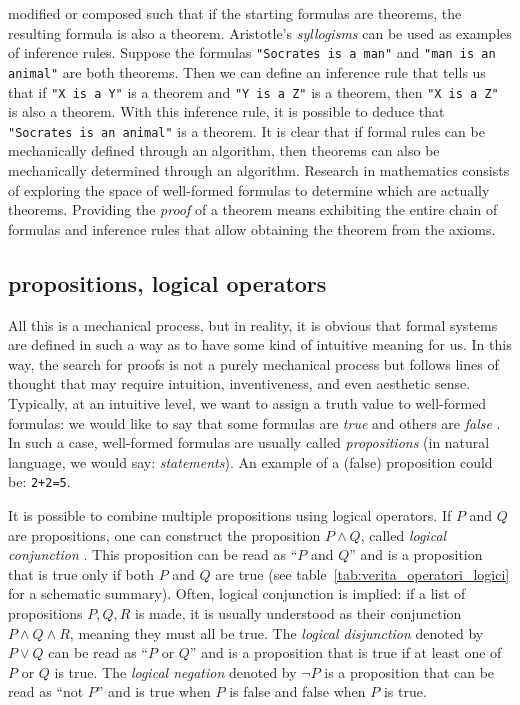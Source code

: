 modified or composed such that if the starting formulas are theorems, the
resulting formula is also a theorem. Aristotle's \emph{syllogisms} can be used
as examples of inference rules. Suppose the formulas \texttt{"Socrates is a
man"} and \texttt{"man is an animal"} are both theorems. Then we can define an
inference rule that tells us that if \texttt{"X is a Y"} is a theorem and
\texttt{"Y is a Z"} is a theorem, then \texttt{"X is a Z"} is also a theorem.
With this inference rule, it is possible to deduce that \texttt{"Socrates is an
animal"} is a theorem. It is clear that if formal rules can be mechanically
defined through an algorithm, then theorems can also be mechanically determined
through an algorithm. Research in mathematics consists of exploring the space of
well-formed formulas to determine which are actually theorems. Providing the
\emph{proof}%
%
 of a theorem means exhibiting the entire chain of formulas and inference rules that allow obtaining the theorem from the axioms.

\subsection{propositions, logical operators}

All this is a mechanical process, but in reality, it is obvious that formal
systems are defined in such a way as to have some kind of intuitive meaning for
us. In this way, the search for proofs is not a purely mechanical process but
follows lines of thought that may require intuition, inventiveness, and even
aesthetic sense. Typically, at an intuitive level, we want to assign a truth
value to well-formed formulas: we would like to say that some formulas are
\emph{true}%
%
 and others are \emph{false}%
%
. In such a case, well-formed formulas are usually called \emph{propositions}%
%
 (in natural language, we would say: \emph{statements}). An example of a (false) proposition could be: \texttt{2+2=5}.

It is possible to combine multiple propositions using logical operators. If $P$
and $Q$ are propositions, one can construct the proposition $P \land Q$, called
\emph{logical conjunction}%
%
. This proposition can be read as ``$P$ and $Q$'' and is a proposition that is true only if both $P$ and $Q$ are true (see table~\ref{tab:verita_operatori_logici} for a schematic summary). Often, logical conjunction is implied: if a list of propositions $P,Q,R$ is made, it is usually understood as their conjunction $P \land Q \land R$, meaning they must all be true. The \emph{logical disjunction}%
%
 denoted by $P \lor Q$ can be read as ``$P$ or $Q$'' and is a proposition that is true if at least one of $P$ or $Q$ is true. The \emph{logical negation}%
%
 denoted by $\lnot P$ is a proposition that can be read as ``not $P$'' and is true when $P$ is false and false when $P$ is true.

